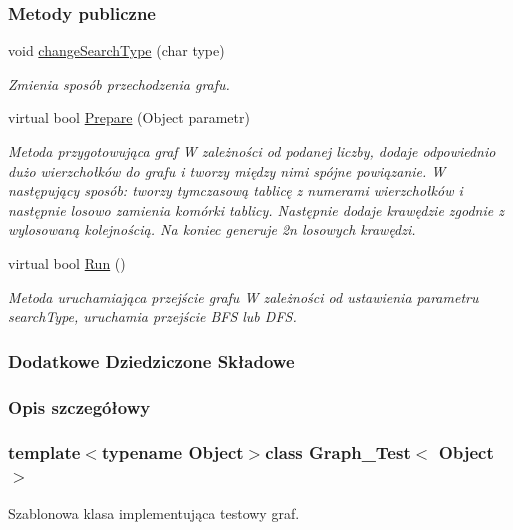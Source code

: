 \subsubsection*{Metody publiczne}
\begin{DoxyCompactItemize}
\item 
void \hyperlink{class_graph___test_aa82baee1265ff1172c802b1fdfdf1290}{change\-Search\-Type} (char type)
\begin{DoxyCompactList}\small\item\em Zmienia sposób przechodzenia grafu. \end{DoxyCompactList}\item 
virtual bool \hyperlink{class_graph___test_acbad8d61bca15e38751e9877c3bfe70d}{Prepare} (Object parametr)
\begin{DoxyCompactList}\small\item\em Metoda przygotowująca graf W zależności od podanej liczby, dodaje odpowiednio dużo wierzchołków do grafu i tworzy między nimi spójne powiązanie. W następujący sposób\-: tworzy tymczasową tablicę z numerami wierzchołków i następnie losowo zamienia komórki tablicy. Następnie dodaje krawędzie zgodnie z wylosowaną kolejnością. Na koniec generuje 2n losowych krawędzi. \end{DoxyCompactList}\item 
virtual bool \hyperlink{class_graph___test_a1f7ecb202fa8d6f02fc2639b9af2ee4a}{Run} ()
\begin{DoxyCompactList}\small\item\em Metoda uruchamiająca przejście grafu W zależności od ustawienia parametru search\-Type, uruchamia przejście B\-F\-S lub D\-F\-S. \end{DoxyCompactList}\end{DoxyCompactItemize}
\subsubsection*{Dodatkowe Dziedziczone Składowe}


\subsubsection{Opis szczegółowy}
\subsubsection*{template$<$typename Object$>$class Graph\-\_\-\-Test$<$ Object $>$}

Szablonowa klasa implementująca testowy graf. 

